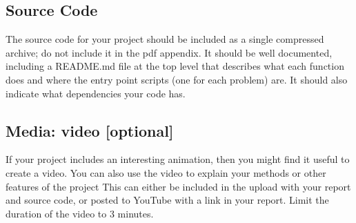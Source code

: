\subsection*{Source Code}
The source code for your project should be included as a single compressed archive;
do not include it in the pdf appendix. It should be well documented, including a
README.md file at the top level that describes what each function does and where the
entry point scripts (one for each problem) are. It should also indicate what dependencies
your code has.

\subsection*{Media: video  [optional]}
If your project includes an interesting animation, then you might find it useful to create a video.
You can also use the video to explain your methods or other features of the project
This can either be included in the upload with your report and source code, or posted to YouTube
with a link in your report. Limit the duration of the video to 3 minutes.


